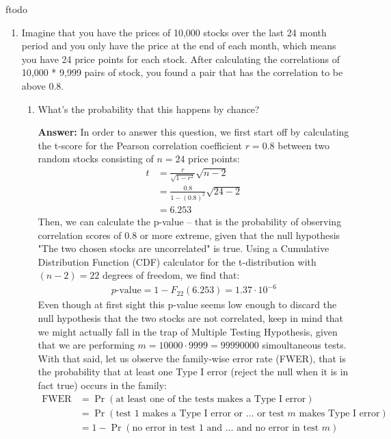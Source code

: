 ƒtodo\documentclass{article}
\newenvironment{QandA}{\begin{enumerate}[label=\arabic*.]}{\end{enumerate}}
\newenvironment{InnerQandA}{\begin{enumerate}[label=\roman*.]}{\end{enumerate}}
\newenvironment{answer}{\par\normalfont \textbf{Answer:}}{}
\begin{document}
\begin{QandA}
    \item Imagine that you have the prices of 10,000 stocks over the last 24 month period and you only have the price at the end of each month, which means you have 24 price points for each stock. After calculating the correlations of 10,000 * 9,999 pairs of stock, you found a pair that has the correlation to be above 0.8.
    \begin{InnerQandA}
        \item What’s the probability that this happens by chance?
        \begin{answer}
            In order to answer this question, we first start off by calculating the t-score for the Pearson correlation coefficient $r=0.8$ between two random stocks consisting of $n=24$ price points:
            \begin{align*}
                t &= \frac{r}{\sqrt{1 - r^2}} \sqrt{n - 2} \\
                &= \frac{0.8}{1 - (0.8)^{2}} \sqrt{24 - 2} \\
                &= 6.253
            \end{align*}
            Then, we can calculate the p-value -- that is the probability of observing correlation scores of $0.8$ or more extreme, given that the null hypothesis "The two chosen stocks are uncorrelated" is true. Using a Cumulative Distribution Function (CDF) calculator for the t-distribution with $(n-2) = 22$ degrees of freedom, we find that:
            \begin{align*}
                p\text{-value} = 1 - F_{22}(6.253) = 1.37 \cdot 10^{-6}
            \end{align*}
            Even though at first sight this p-value seems low enough to discard the null hypothesis that the two stocks are not correlated, keep in mind that we might actually fall in the trap of Multiple Testing Hypothesis, given that we are performing $m = 10000 \cdot 9999 = 99990000$ simoultaneous tests. With that said, let us observe the family-wise error rate (FWER), that is the probability that at least one Type I error (reject the null when it is in fact true) occurs in the family:
            \begin{align*}
                \text{FWER} &= \Pr (\text{at least one of the tests makes a Type I error}) \\
                &= \Pr(\text{test } 1 \text{ makes a Type I error or }\ldots \text{ or test } m \text{ makes Type I error}) \\
                &= 1 - \Pr(\text{no error in test } 1 \text{ and } \ldots \text{ and no error in test } m) \\

\end{align*}
\end{answer}
\end{InnerQandA}
\end{QandA}
\end{document}
